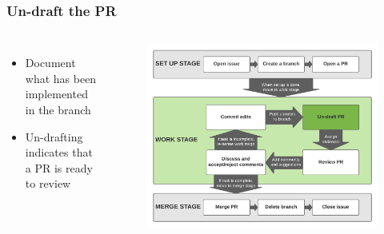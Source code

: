 \documentclass[aspectratio=169]{beamer} %
\begin{document}
\begin{frame}
	\frametitle{Un-draft the PR}
	\begin{columns}[c]

		\begin{itemize}
			\setlength\itemsep{1em}
			\item Document what has been implemented in the branch
			\item Un-drafting indicates that a PR is ready to review
		\end{itemize}

		\vspace{-.75cm}
		\begin{figure}
			\centering
			\includegraphics[width=\textwidth]{./img/branch-pr-merge-cycle-S2-2.png}
		\end{figure}

	\end{columns}
\end{frame}
\end{document}
